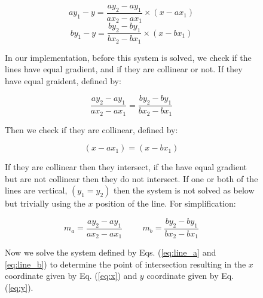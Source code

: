 \documentclass[11pt,landscape]{article}
\begin{document}
\begin{multicols}{3}
\begin{figure}[H]
    \begin{mdframed}
        \begin{center}
            \begin{equation}
                ay_1-y = \frac{ay_2 - ay_1}{ax_2 - ax_1} \times (x - ax_1)
                \label{eq:line_a}
            \end{equation}
            \begin{equation}
                by_1-y = \frac{by_2 - by_1}{bx_2 - bx_1} \times (x - bx_1)
                \label{eq:line_b}
            \end{equation}
        \end{center}
    In our implementation, before this system is solved, we check
    if the lines have equal gradient, and if they are collinear or not. If they
    have equal graident, defined by:
    \begin{center}
        \begin{equation*}
            \frac{ay_2 - ay_1}{ax_2 - ax_1} = \frac{by_2 - by_1}{bx_2 - bx_1}
        \end{equation*}
    \end{center}
    Then we check if they are collinear, defined by:
    \begin{center}
        \begin{equation*}
            (x - ax_1) = (x - bx_1)
        \end{equation*}
    \end{center}
    If they are collinear then they intersect, if the have equal gradient but
    are not collinear then they do not intersect. If one or both of the lines
    are vertical, $(y_1 = y_2)$ then the system is not solved as below but
    trivially using the $x$ position of the line.\vspace{0.5cm}
    \newline
    For simplification:
    \begin{center}
        \begin{equation*}
            m_a = \frac{ay_2 - ay_1}{ax_2 - ax_1} \hspace{1cm} m_b = \frac{by_2 - by_1}{bx_2 - bx_1}
        \end{equation*}
    \end{center}
    Now we solve the system defined by Eqs. (\ref{eq:line_a} and
    \ref{eq:line_b}) to determine the point of intersection resulting in the $x$
    coordinate given by Eq. (\ref{eq:x}) and $y$ coordinate given by Eq. (\ref{eq:y}).

\end{mdframed}
\end{figure}
\end{multicols}
\end{document}
